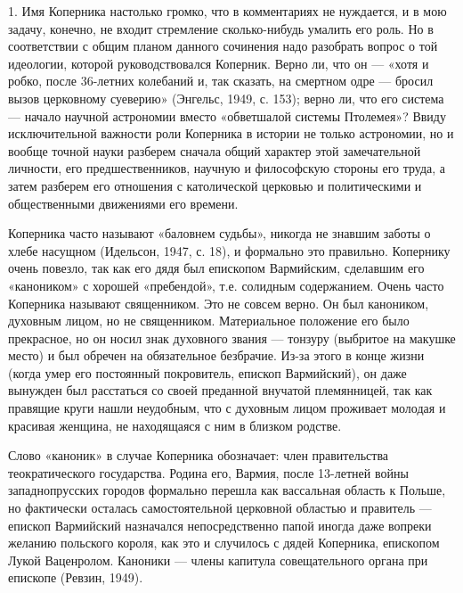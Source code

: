 1. Имя Коперника настолько громко,  что в комментариях не нуждается, и
в мою задачу, конечно, не входит стремление сколько-нибудь умалить его
роль.  Но  в  соответствии  с  общим  планом  данного  сочинения  надо
разобрать вопрос  о той идеологии, которой  руководствовался Коперник.
Верно ли, что  он --- «хотя и робко, после  36-летних колебаний и, так
сказать,  на  смертном  одре  --- бросил  вызов  церковному  суеверию»
(Энгельс, 1949, с. 153); верно ли,  что его система --- начало научной
астрономии вместо «обветшалой  системы Птолемея»? Ввиду исключительной
важности роли  Коперника в истории  не только астрономии, но  и вообще
точной  науки  разберем  сначала  общий  характер  этой  замечательной
личности,  его предшественников,  научную  и  философскую стороны  его
труда,  а  затем разберем  его  отношения  с католической  церковью  и
политическими и общественными движениями его времени.

Коперника часто называют «баловнем  судьбы», никогда не знавшим заботы
о хлебе насущном  (Идельсон, 1947, с. 18), и  формально это правильно.
Копернику очень  повезло, так как  его дядя был  епископом Вармийским,
сделавшим  его  «каноником»  с   хорошей  «пребендой»,  т.е.  солидным
содержанием.  Очень  часто  Коперника  называют  священником.  Это  не
совсем верно.  Он был  каноником, духовным  лицом, но  не священником.
Материальное положение его было прекрасное, но он носил знак духовного
звания  --- тонзуру  (выбритое  на  макушке место)  и  был обречен  на
обязательное  безбрачие. Из-за  этого в  конце жизни  (когда умер  его
постоянный  покровитель, епископ  Вармийский),  он  даже вынужден  был
расстаться со  своей преданной внучатой племянницей,  так как правящие
круги  нашли  неудобным, что  с  духовным  лицом проживает  молодая  и
красивая женщина, не находящаяся с ним в близком родстве.

Слово  «каноник» в  случае  Коперника  обозначает: член  правительства
теократического государства. Родина его, Вармия, после 13-летней войны
западнопрусских  городов формально  перешла как  вассальная область  к
Польше, но  фактически осталась  самостоятельной церковной  областью и
правитель  ---  епископ  Вармийский назначался  непосредственно  папой
иногда даже  вопреки желанию польского  короля, как это и  случилось с
дядей  Коперника,  епископом  Лукой  Ваценролом.  Каноники  ---  члены
капитула совещательного органа при епископе (Ревзин, 1949).

